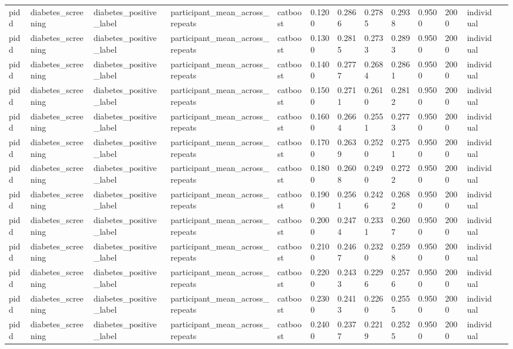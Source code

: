 \begin{tabular}{lllllllllllll}
pidd & diabetes\_screening & diabetes\_positive\_label & participant\_mean\_across\_repeats & catboost & 0.1200 & 0.2866 & 0.2785 & 0.2938 & 0.9500 & 2000 & individual &  \\
pidd & diabetes\_screening & diabetes\_positive\_label & participant\_mean\_across\_repeats & catboost & 0.1300 & 0.2815 & 0.2733 & 0.2893 & 0.9500 & 2000 & individual &  \\
pidd & diabetes\_screening & diabetes\_positive\_label & participant\_mean\_across\_repeats & catboost & 0.1400 & 0.2777 & 0.2684 & 0.2861 & 0.9500 & 2000 & individual &  \\
pidd & diabetes\_screening & diabetes\_positive\_label & participant\_mean\_across\_repeats & catboost & 0.1500 & 0.2711 & 0.2610 & 0.2812 & 0.9500 & 2000 & individual &  \\
pidd & diabetes\_screening & diabetes\_positive\_label & participant\_mean\_across\_repeats & catboost & 0.1600 & 0.2664 & 0.2551 & 0.2773 & 0.9500 & 2000 & individual &  \\
pidd & diabetes\_screening & diabetes\_positive\_label & participant\_mean\_across\_repeats & catboost & 0.1700 & 0.2639 & 0.2520 & 0.2751 & 0.9500 & 2000 & individual &  \\
pidd & diabetes\_screening & diabetes\_positive\_label & participant\_mean\_across\_repeats & catboost & 0.1800 & 0.2608 & 0.2490 & 0.2722 & 0.9500 & 2000 & individual &  \\
pidd & diabetes\_screening & diabetes\_positive\_label & participant\_mean\_across\_repeats & catboost & 0.1900 & 0.2561 & 0.2426 & 0.2682 & 0.9500 & 2000 & individual &  \\
pidd & diabetes\_screening & diabetes\_positive\_label & participant\_mean\_across\_repeats & catboost & 0.2000 & 0.2474 & 0.2331 & 0.2607 & 0.9500 & 2000 & individual &  \\
pidd & diabetes\_screening & diabetes\_positive\_label & participant\_mean\_across\_repeats & catboost & 0.2100 & 0.2467 & 0.2320 & 0.2598 & 0.9500 & 2000 & individual &  \\
pidd & diabetes\_screening & diabetes\_positive\_label & participant\_mean\_across\_repeats & catboost & 0.2200 & 0.2433 & 0.2296 & 0.2576 & 0.9500 & 2000 & individual &  \\
pidd & diabetes\_screening & diabetes\_positive\_label & participant\_mean\_across\_repeats & catboost & 0.2300 & 0.2413 & 0.2260 & 0.2555 & 0.9500 & 2000 & individual &  \\
pidd & diabetes\_screening & diabetes\_positive\_label & participant\_mean\_across\_repeats & catboost & 0.2400 & 0.2377 & 0.2219 & 0.2525 & 0.9500 & 2000 & individual &  \\

\end{tabular}
